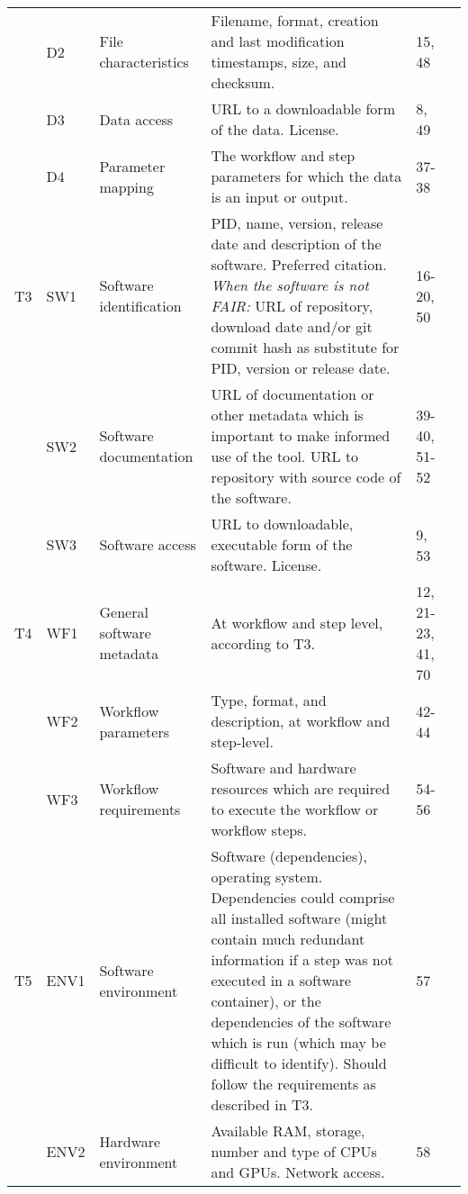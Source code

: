 \begin{table*}
\begin{tabularx}{\linewidth}{p{0.1in}p{0.3in}p{1.3in}Lp{0.45in}p{0.3in}}
    & D2    & File characteristics              & Filename, format, creation and last modification timestamps, size, and checksum.  & 15, 48  &  \\
    & D3    & Data access                       & URL to a downloadable form of the data. License.   &  8, 49  & \\
    & D4    & Parameter mapping                 & The workflow and step parameters for which the data is an input or output.   & 37-38 &   \\
\midrule
T3  & SW1   & Software identification           & PID, name, version, release date and description of the software. Preferred citation. \textit{When the software is not FAIR:} URL of repository, download date and/or git commit hash as substitute for PID, version or release date.       &  16-20, 50     &   \citep{smithSoftwareCitationPrinciples2016} \\
    & SW2   & Software documentation            & URL of documentation or other metadata which is important to make informed use of the tool. URL to repository with source code of the software. &  39-40, 51-52  & \\
    & SW3   & Software access                   & URL to downloadable, executable form of the software. License.               &  9, 53  & \\
\midrule
T4  & WF1   & General software metadata         & At workflow and step level, according to T3.                 & 12, 21-23, 41, 70 & \citep{gobleFAIRComputationalWorkflows2020}\\
    & WF2   & Workflow parameters               & Type, format, and description, at workflow and step-level.                & 42-44  & \\
    & WF3   & Workflow requirements             & Software and hardware resources which are required to execute the workflow or workflow steps. &  54-56  & \\
\midrule
T5  & ENV1  & Software environment              & Software (dependencies), operating system. Dependencies could comprise all installed software (might contain much redundant information if a step was not executed in a software container), or the dependencies of the software which is run (which may be difficult to identify). Should follow the requirements as described in T3.       &    57     &  \citep{committeeonreproducibilityandreplicabilityinscienceReproducibilityReplicabilityScience2019}  \\
    & ENV2  & Hardware environment              & Available RAM, storage, number and type of CPUs and GPUs. Network access.       &    58        & \\

\end{tabularx}
\end{table*}
